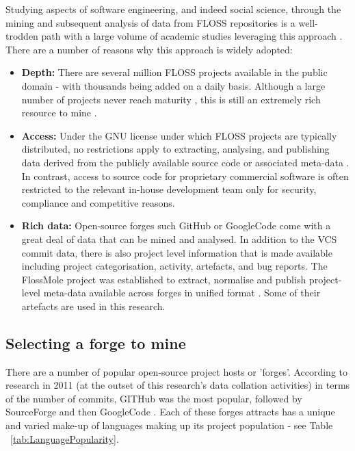 Studying aspects of software engineering, and indeed social science, through the mining and subsequent analysis of data from FLOSS repositories is a well-trodden path with a large volume of academic studies leveraging this approach \citep{hassan2008road, hemmati2013msr}. There are a number of reasons why this approach is widely adopted:

\begin{itemize}
\item \textbf{Depth:} There are several million FLOSS projects available in the public domain - with thousands being added on a daily basis. Although a large number of projects never reach maturity \citep{comino2005planning}, this is still an extremely rich resource to mine \citep{deshpande2008total}.
\item \textbf{Access:} Under the GNU license under which FLOSS projects are typically distributed, no restrictions apply to extracting, analysing, and publishing data derived from the publicly available source code or associated meta-data \citep{license2007version}. In contrast, access to source code for proprietary commercial software is often restricted to the relevant in-house development team only for security, compliance and competitive reasons.
\item \textbf{Rich data:} Open-source forges such GitHub \citep{github} or GoogleCode \citep{googlecode} come with a great deal of data that can be mined and analysed. In addition to the VCS commit data, there is also project level information that is made available including project categorisation, activity, artefacts, and bug reports. The FlossMole project was established to extract, normalise and publish project-level meta-data available across forges in unified format \citep{howison2009flossmole}. Some of their artefacts are used in this research.
\end{itemize}

\subsection{Selecting a forge to mine}
There are a number of popular open-source project hosts or 'forges'. According to research in 2011 (at the outset of this research's data collation activities) in terms of the number of commits, GITHub was the most popular, followed by SourceForge and then GoogleCode \citep{grady2011what}. Each of these forges attracts has a unique and varied make-up of languages making up its project population - see Table ~\ref{tab:LanguagePopularity}.

